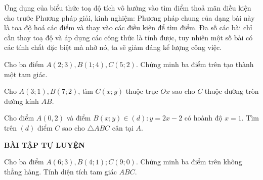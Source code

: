 \begin{dang}{Ứng dụng của biểu thức toạ độ tích vô hướng vào tìm điểm thoả mãn điều kiện cho trước}
	Phương pháp giải, kinh nghiệm: Phương pháp chung của dạng bài này là toạ độ hoá các điểm và thay vào các điều kiện để tìm điểm. Đa số các bài chỉ cần thay toạ độ và áp dụng các công thức là tính được, tuy nhiên một số bài có các tính chất đặc biệt mà nhờ nó, ta sẽ giảm đáng kể lượng công việc.
\end{dang}
\begin{vd}%
	Cho ba điểm $A(2;3), B(1;4), C(5;2)$. Chứng minh ba điểm trên tạo thành một tam  giác.
\end{vd}
\begin{vd}%
	Cho $A(3;1), B(7;2)$, tìm $C(x;y)$ thuộc trục $Ox$ sao cho $C$ thuộc đường tròn đường kính $AB$.
\end{vd}
\begin{vd}%
	Cho điểm $A(0,2)$ và điểm $B(x;y)\in (d):y=2x-2$ có hoành độ $x=1$. Tìm trên $(d)$ điểm $C$ sao cho $\triangle ABC$ cân tại $A$.
\end{vd}    
\begin{center}
	\textbf{BÀI TẬP TỰ LUYỆN }
\end{center}
\begin{bt}%
	Cho ba điểm $A(6;3), B(4;1); C(9;0)$. Chứng minh ba điểm trên không thẳng hàng. Tính diện tích tam giác $ABC$.
\end{bt}
